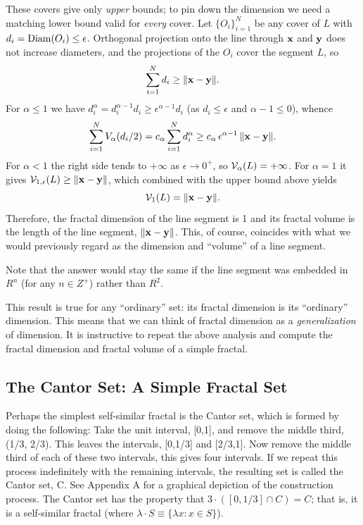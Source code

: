 These covers give only {\it upper\/} bounds; to pin down the dimension we
need a matching lower bound valid for {\it every\/} cover. Let
$\{O_i\}_{i=1}^N$ be any cover of $L$ with $d_i = {\rm Diam}(O_i) \le
\epsilon$. Orthogonal projection onto the line through ${\bf x}$ and
${\bf y}$ does not increase diameters, and the projections of the $O_i$
cover the segment $L$, so
$$
\sum_{i=1}^N d_i \ge \|{\bf x} - {\bf y}\|.
$$
For $\alpha \le 1$ we have $d_i^\alpha = d_i^{\alpha - 1} d_i \ge
\epsilon^{\alpha - 1} d_i$ (as $d_i \le \epsilon$ and $\alpha - 1 \le 0$),
whence
$$
\sum_{i=1}^N V_\alpha(d_i / 2) = c_\alpha \sum_{i=1}^N d_i^\alpha
\ge c_\alpha \, \epsilon^{\alpha - 1} \, \|{\bf x} - {\bf y}\|.
$$
For $\alpha < 1$ the right side tends to $+\infty$ as
$\epsilon \rightarrow 0^+$, so ${\cal V}_\alpha(L) = +\infty$. For
$\alpha = 1$ it gives ${\cal V}_{1, \epsilon}(L) \ge \|{\bf x} - {\bf y}\|$,
which combined with the upper bound above yields
$$
{\cal V}_1(L) = \| {\bf x} - {\bf y}\|.
$$
Therefore, the fractal dimension of the line segment is
1 and its fractal volume is the length of the line segment, $\|{\bf x} - {\bf
y}\|$. This, of course, coincides with what we would previously regard
as the dimension and ``volume'' of a line segment.

Note that the answer would stay the same if the line segment was 
embedded in $R^n$ (for any $n \in Z^+$) rather than $R^2$.


This result is true for any ``ordinary'' set: its fractal dimension is its
``ordinary'' dimension. This means that we can think of fractal
dimension as a {\it generalization} of dimension. It is 
instructive to repeat the above analysis and compute the fractal dimension 
and fractal volume of a simple fractal.


\subsection{The Cantor Set: A Simple Fractal Set}

Perhaps the simplest self-similar fractal is the Cantor set, which is
formed by doing the following:
Take the unit interval, [0,1], and remove the middle third, (1/3,
2/3). This leaves the intervals, [0,1/3] and [2/3,1]. Now remove the
middle third of each of these two intervals, this gives four
intervals.
If we repeat this process indefinitely with the remaining
intervals, the resulting set is called the Cantor set, C. See 
Appendix A for a graphical depiction of the construction process.
The Cantor
set has the property that $3 \cdot \left([0,1/3] \cap C\right) = C$; that is,
it is a self-similar fractal (where $\lambda \cdot S \equiv \{\lambda x : x \in S\}$).

